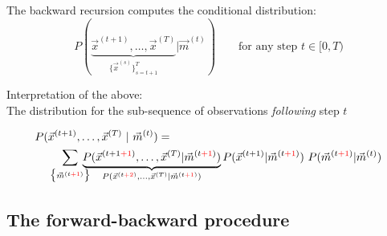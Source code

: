 \begin{frame}{\subsecname}

The backward recursion computes the conditional distribution:
\begin{equation}
P(
\underbrace{\vec x^{(t+1)}, \ldots, \vec x^{(T)}
}_{
\{\vec x^{(s)}\}_{s=t+1}^T
} | \vec m^{(t)})
\qquad 
\text{for any step }t \in \lbrack0, T)
\end{equation}

Interpretation of the above:\\

The distribution for the sub-sequence of observations \emph{following} step $t$


\pause


\pause

\svspace{-5mm}

\begin{align}
P(&\vec{x}^{(t+1)}, \ldots, \vec{x}^{(T)} ~|~ \vec{m}^{(t)}) =\\
				&\sum_{\big\{\vec{m}^{(t{\color{red}+1})}\big\}} \kern-2ex
				\underbrace{
				P(\vec{x}^{(t+1{\color{red}+1})}, \ldots, \vec{x}^{(T)} | \vec{m}^{(t{\color{red}+1})})
				}_{
				P(\vec{x}^{(t{\color{red}+2})}, \ldots, \vec{x}^{(T)} | \vec{m}^{(t{\color{red}+1})})
				}
				P(\vec{x}^{(t{+1})} | \vec{m}^{(t{\color{red}+1})}) ~
				P(\vec{m}^{(t{\color{red}+1})} | \vec{m}^{(t)})
\end{align}


\end{frame}

\subsection{The forward-backward procedure}

